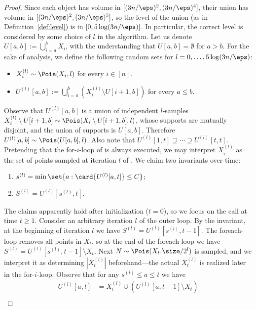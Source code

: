 \begin{proof}
    Since each object has volume in $[(3n/\eps)^2, (3n/\eps)^4]$, their union has volume in $[(3n/\eps)^2, (3n/\eps)^5]$, so the level of the union (as in Definition~\ref{def:level}) is in $[0, 5\log(3n/\eps)]$. In particular, the correct level is considered by some choice of $l$ in the algorithm.
%
    Let us denote $U[a,b] := \bigcup_{i=a}^b X_i$, with the understanding that $U[a,b] = \emptyset$ for $a > b$. For the sake of analysis, we define the following random sets for $l = 0, \dots, 5 \log(3n/\eps)$:
    \begin{itemize}
        \item $X_i^{(l)} \sim \Pois(X_i, l)$ for every $i \in [n]$.
        \item $U^{(l)}[a,b] := \bigcup_{i=a}^{b} ( X_i^{(l)} \setminus U[i+1,b] )$ for every $a \leq b$.
    \end{itemize}
    Observe that $U^{(l)}[a,b]$ is a union of independent $l$-samples $X_i^{(l)} \setminus U[i+1,b] \sim \Pois(X_i \setminus U[i+1,b], l)$, whose supports are mutually disjoint, and the union of supports is $U[a,b]$. Therefore $U^{(l)}[a,b] \sim \Pois(U[a,b], l)$. Also note that $U^{(l)}[1,t] \supseteq \cdots \supseteq U^{(l)}[t,t]$.
%
    Pretending that the for-$i$-loop of \ins is always executed, we may interpret $X_i^{(l)}$ as the set of points sampled at iteration $l$ of . We claim two invariants over time:
    \begin{enumerate}[label={(\roman*)}]
        \item $s^{(l)} = \min \set{a : \card{U^{(l)}[a,t]} \leq C }$;
        \item $S^{(l)} = U^{(l)}[s^{(l)}, t]$.
    \end{enumerate}
%
    The claims apparently hold after initialization ($t = 0$), so we focus on the call  at time $t \geq 1$. Consider an arbitrary iteration $l$ of the outer loop. By the invariant, at the beginning of iteration $l$ we have $S^{(l)} = U^{(l)}[s^{(l)}, t-1]$. The foreach-loop removes all points in $X_t$, so at the end of the foreach-loop we have $S^{(l)} = U^{(l)}[s^{(l)}, t-1] \setminus X_t$. Next $N \sim \Pois(X_t.\size/2^l)$ is sampled, and we interpret it as determining $|X_t^{(l)}|$ beforehand---the actual $X_t^{(l)}$ is realized later in the for-$i$-loop. 
%
    Observe that for any $s^{(l)} \le a \le t$ we have
    \begin{align*}
        U^{(l)}[a,t]
        &= X_t^{(l)} \cup (U^{(l)}[a, t-1] \setminus X_t) \\

\end{align*}
\end{proof}

